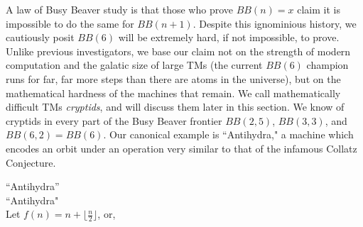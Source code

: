 
A law of Busy Beaver study is that those who prove $BB(n) = x$ claim it is impossible to do the same for $BB(n+1)$. Despite this ignominious history, we cautiously posit $BB(6)$ will be extremely hard, if not impossible, to prove. Unlike previous investigators, we base our claim not on the strength of modern computation and the galatic size of large TMs (the current $BB(6)$ champion runs for far, far more steps than there are atoms in the universe), but on the mathematical hardness of the machines that remain.
We call mathematically difficult TMs \textit{cryptids}, and will discuss them later in this section. We know of cryptids in every part of the Busy Beaver frontier $BB(2,5)$, $BB(3,3)$, and $BB(6,2) = BB(6)$. Our canonical example is ``Antihydra," a machine which encodes an orbit under an operation very similar to that of the infamous Collatz Conjecture.

\begin{example}
    ``Antihydra'' \\
    ``Antihydra"  \\
    Let $f(n) = n + \lfloor \frac{n}{2} \rfloor$, or, 
\end{example}
